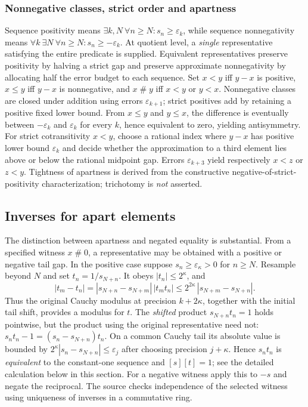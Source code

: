 \documentclass[11pt,reqno]{amsart}
\theoremstyle{definition}\newtheorem{definition}[theorem]{Definition}
\theoremstyle{remark}\newtheorem{remark}[theorem]{Remark}
\newcommand{\eps}{\varepsilon}
\newcommand{\Apt}{\mathrel{\#}}
\begin{document}
\medskip
\subsubsection*{Nonnegative classes, strict order and apartness}\label{supp:12-5}
Sequence positivity means $\exists k,N\ \forall n\ge N: s_n\ge\eps_k$, while sequence nonnegativity means $\forall k\ \exists N\ \forall n\ge N:s_n\ge-\eps_k$. At quotient level, a \emph{single} representative satisfying the entire predicate is supplied. Equivalent representatives preserve positivity by halving a strict gap and preserve approximate nonnegativity by allocating half the error budget to each sequence. Set $x<y$ iff $y-x$ is positive, $x\le y$ iff $y-x$ is nonnegative, and $x\Apt y$ iff $x<y$ or $y<x$. Nonnegative classes are closed under addition using errors $\eps_{k+1}$; strict positives add by retaining a positive fixed lower bound. From $x\le y$ and $y\le x$, the difference is eventually between $-\eps_k$ and $\eps_k$ for every $k$, hence equivalent to zero, yielding antisymmetry. For strict cotransitivity $x<y$, choose a rational index where $y-x$ has positive lower bound $\eps_k$ and decide whether the approximation to a third element lies above or below the rational midpoint gap. Errors $\eps_{k+3}$ yield respectively $x<z$ or $z<y$. Tightness of apartness is derived from the constructive negative-of-strict-positivity characterization; trichotomy is \emph{not} asserted.
\medskip

\subsection{Inverses for apart elements}\label{main:sub-44}\label{subsec:inverse}
The distinction between apartness and negated equality is substantial. From a specified witness $x\Apt0$, a representative may be obtained with a positive or negative tail gap. In the positive case suppose $s_n\ge\eps_\kappa>0$ for $n\ge N$. Resample beyond $N$ and set $t_n=1/s_{N+n}$. It obeys $|t_n|\le2^\kappa$, and
\begin{equation}\label{eq:inversebound}
|t_m-t_n|=|s_{N+n}-s_{N+m}|\,|t_mt_n|
\le 2^{2\kappa}\,|s_{N+m}-s_{N+n}|.
\end{equation}
Thus the original Cauchy modulus at precision $k+2\kappa$, together with the initial tail shift, provides a modulus for $t$. The \emph{shifted} product $s_{N+n}t_n=1$ holds pointwise, but the product using the original representative need not: $s_nt_n-1=(s_n-s_{N+n})t_n$. On a common Cauchy tail its absolute value is bounded by $2^\kappa|s_n-s_{N+n}|\le\eps_j$ after choosing precision $j+\kappa$. Hence $s_nt_n$ is \emph{equivalent} to the constant-one sequence and $[s][t]=1$; see the detailed calculation below in this section. For a negative witness apply this to $-s$ and negate the reciprocal. The source checks independence of the selected witness using uniqueness of inverses in a commutative ring.
\end{document}
